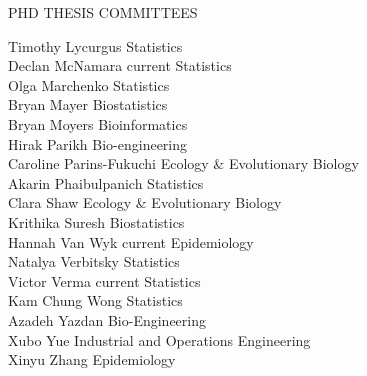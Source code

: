 \begin{mylist}{PHD THESIS COMMITTEES}
\begin{tabbing}
Timothy Lycurgus  \> Statistics\\
Declan McNamara \> current \> Statistics\\
Olga Marchenko  \> Statistics\\
Bryan Mayer  \> Biostatistics\\
Bryan Moyers \> Bioinformatics\\
Hirak Parikh  \> Bio-engineering\\
Caroline Parins-Fukuchi  \> Ecology \& Evolutionary Biology\\
Akarin Phaibulpanich  \> Statistics\\
Clara Shaw \> Ecology \& Evolutionary Biology\\
Krithika Suresh  \> Biostatistics\\
Hannah Van Wyk \> current \> Epidemiology\\
Natalya Verbitsky  \> Statistics\\
Victor Verma \> current \> Statistics\\
Kam Chung Wong  \> Statistics\\
Azadeh Yazdan  \> Bio-Engineering\\
Xubo Yue  \> Industrial and Operations Engineering\\
Xinyu Zhang  \> Epidemiology \\
\end{tabbing}


\end{mylist}

